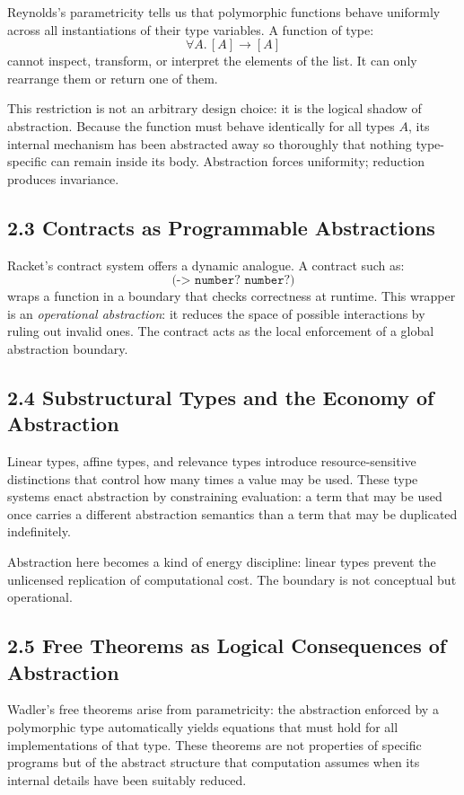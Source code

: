 \documentclass[12pt,letterpaper]{article}
\theoremstyle{remark}
\begin{document}
Reynolds’s parametricity tells us that polymorphic functions behave uniformly across all instantiations of their type variables. A function of type:
\[
\forall A.\, [A] \to [A]
\]
cannot inspect, transform, or interpret the elements of the list. It can only rearrange them or return one of them.

This restriction is not an arbitrary design choice: it is the logical shadow of abstraction. Because the function must behave identically for all types \(A\), its internal mechanism has been abstracted away so thoroughly that nothing type-specific can remain inside its body. Abstraction forces uniformity; reduction produces invariance.

\subsection{2.3 Contracts as Programmable Abstractions}

Racket's contract system offers a dynamic analogue. A contract such as:
\[
\texttt{(-> number? number?)}
\]
wraps a function in a boundary that checks correctness at runtime. This wrapper is an \emph{operational abstraction}: it reduces the space of possible interactions by ruling out invalid ones. The contract acts as the local enforcement of a global abstraction boundary.

\subsection{2.4 Substructural Types and the Economy of Abstraction}

Linear types, affine types, and relevance types introduce resource-sensitive distinctions that control how many times a value may be used. These type systems enact abstraction by constraining evaluation: a term that may be used once carries a different abstraction semantics than a term that may be duplicated indefinitely.

Abstraction here becomes a kind of energy discipline: linear types prevent the unlicensed replication of computational cost. The boundary is not conceptual but operational.

\subsection{2.5 Free Theorems as Logical Consequences of Abstraction}

Wadler’s free theorems arise from parametricity: the abstraction enforced by a polymorphic type automatically yields equations that must hold for all implementations of that type. These theorems are not properties of specific programs but of the abstract structure that computation assumes when its internal details have been suitably reduced.
\end{document}
